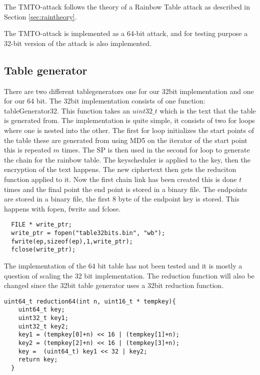 The TMTO-attack follows the theory of a Rainbow Table attack as
described in Section \ref{sec:raintheory}.

The TMTO-attack is implemented as a 64-bit attack, and for testing
purpose a 32-bit version of the attack is also implemented.

\subsection{Table generator}

There are two different tablegenerators one for our 32bit implementation and one for our 64 bit.
The 32bit implementation consists of one function: tableGenerator32. This function takes an $uint32\_t$ which is the text that the table is generated from. The implementation is quite simple, it consists of two for loops where one is nested into the other. The first for loop initializes the start points of the table these are generated from using MD5 on the iterator of the start point this is repeated $m$ times.
The SP is then used in the second for loop to generate the chain for the rainbow table.
The keyscheduler is applied to the key, then the encryption of the text happens. The new ciphertext then gets the reduciton function applied to it. Now the first chain link has been created this is done $t$ times and the final point the end point is stored in a binary file.
The endpoints are stored in a binary file, the first 8 byte of the endpoint key is stored. This happens with fopen, fwrite and fclose.
\lstset{language=C}
\begin{lstlisting}
  FILE * write_ptr;
  write_ptr = fopen("table32bits.bin", "wb");
  fwrite(ep,sizeof(ep),1,write_ptr);
  fclose(write_ptr);
\end{lstlisting}
The implementation of the 64 bit table has not been tested and it is mostly a question of scaling the 32 bit implementation. The reduction function will also be changed since the 32bit table generator uses a 32bit reduction function.
\begin{lstlisting}
uint64_t reduction64(int n, uint16_t * tempkey){
    uint64_t key;
    uint32_t key1;
    uint32_t key2;
    key1 = (tempkey[0]+n) << 16 | (tempkey[1]+n);
    key2 = (tempkey[2]+n) << 16 | (tempkey[3]+n);
    key =  (uint64_t) key1 << 32 | key2;
    return key;
  }
\end{lstlisting}


